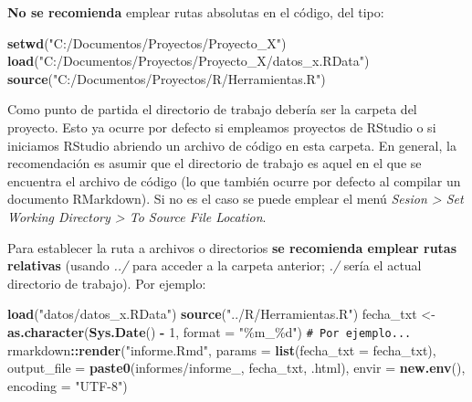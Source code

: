 \documentclass[
]{book}
\newenvironment{Shaded}{\begin{snugshade}}{\end{snugshade}}
\newcommand{\AttributeTok}[1]{\textcolor[rgb]{0.13,0.29,0.53}{#1}}
\newcommand{\CommentTok}[1]{\textcolor[rgb]{0.56,0.35,0.01}{\textit{#1}}}
\newcommand{\DecValTok}[1]{\textcolor[rgb]{0.00,0.00,0.81}{#1}}
\newcommand{\FunctionTok}[1]{\textcolor[rgb]{0.13,0.29,0.53}{\textbf{#1}}}
\newcommand{\NormalTok}[1]{#1}
\newcommand{\OtherTok}[1]{\textcolor[rgb]{0.56,0.35,0.01}{#1}}
\newcommand{\SpecialCharTok}[1]{\textcolor[rgb]{0.81,0.36,0.00}{\textbf{#1}}}
\newcommand{\StringTok}[1]{\textcolor[rgb]{0.31,0.60,0.02}{#1}}
\theoremstyle{break}
\theoremstyle{nonumberplain}
\renewcommand{\CommentTok}[1]{\textcolor[rgb]{0.41,0.41,0.41}{\texttt{#1}}}
\begin{document}
\textbf{No se recomienda} emplear rutas absolutas en el código, del tipo:

\begin{Shaded}
\begin{Highlighting}[]
\FunctionTok{setwd}\NormalTok{(}\StringTok{"C:/Documentos/Proyectos/Proyecto\_X"}\NormalTok{)}
\FunctionTok{load}\NormalTok{(}\StringTok{"C:/Documentos/Proyectos/Proyecto\_X/datos\_x.RData"}\NormalTok{)}
\FunctionTok{source}\NormalTok{(}\StringTok{"C:/Documentos/Proyectos/R/Herramientas.R"}\NormalTok{)}
\end{Highlighting}
\end{Shaded}

Como punto de partida el directorio de trabajo debería ser la carpeta del proyecto.
Esto ya ocurre por defecto si empleamos proyectos de RStudio o si iniciamos RStudio abriendo un archivo de código en esta carpeta.
En general, la recomendación es asumir que el directorio de trabajo es aquel en el que se encuentra el archivo de código (lo que también ocurre por defecto al compilar un documento RMarkdown).
Si no es el caso se puede emplear el menú \emph{Sesion \textgreater{} Set Working Directory \textgreater{} To Source File Location}.

Para establecer la ruta a archivos o directorios \textbf{se recomienda emplear rutas relativas} (usando \emph{../} para acceder a la carpeta anterior; \emph{./} sería el actual directorio de trabajo).
Por ejemplo:

\begin{Shaded}
\begin{Highlighting}[]
\FunctionTok{load}\NormalTok{(}\StringTok{"datos/datos\_x.RData"}\NormalTok{)}
\FunctionTok{source}\NormalTok{(}\StringTok{"../R/Herramientas.R"}\NormalTok{)}
\NormalTok{fecha\_txt }\OtherTok{\textless{}{-}} \FunctionTok{as.character}\NormalTok{(}\FunctionTok{Sys.Date}\NormalTok{() }\SpecialCharTok{{-}} \DecValTok{1}\NormalTok{, }\AttributeTok{format =} \StringTok{"\%m\_\%d"}\NormalTok{) }\CommentTok{\# Por ejemplo...}
\NormalTok{rmarkdown}\SpecialCharTok{::}\FunctionTok{render}\NormalTok{(}\StringTok{"informe.Rmd"}\NormalTok{, }\AttributeTok{params =} \FunctionTok{list}\NormalTok{(}\AttributeTok{fecha\_txt =}\NormalTok{ fecha\_txt),}
                  \AttributeTok{output\_file =} \FunctionTok{paste0}\NormalTok{(}\StringTok{\textquotesingle{}informes/informe\_\textquotesingle{}}\NormalTok{, fecha\_txt, }\StringTok{\textquotesingle{}.html\textquotesingle{}}\NormalTok{), }
                  \AttributeTok{envir =} \FunctionTok{new.env}\NormalTok{(), }\AttributeTok{encoding =} \StringTok{"UTF{-}8"}\NormalTok{)}
\end{Highlighting}
\end{Shaded}
\end{document}

